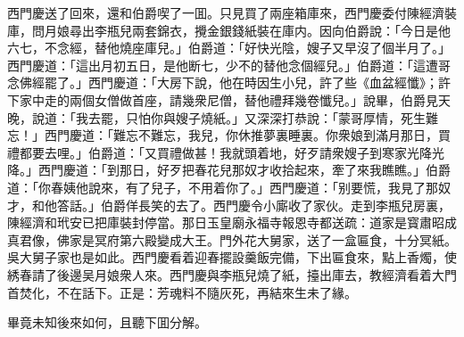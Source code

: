 西門慶送了回來，還和伯爵喫了一囬。只見買了兩座箱庫來，西門慶委付陳經濟裝庫，問月娘尋出李瓶兒兩套錦衣，攪金銀錢紙裝在庫内。因向伯爵說：「今日是他六七，不念經，替他燒座庫兒。」伯爵道：「好快光陰，嫂子又早沒了個半月了。」西門慶道：「這出月初五日，是他断七，少不的替他念個經兒。」伯爵道：「這遭哥念佛經罷了。」西門慶道：「大房下說，他在時因生小兒，許了些《血盆經懺》；許下家中走的兩個女僧做首座，請幾衆尼僧，替他禮拜幾卷懺兒。」說畢，伯爵見天晚，說道：「我去罷，只怕你與嫂子燒紙。」又深深打恭說：「蒙哥厚情，死生難忘！」西門慶道：「難忘不難忘，我兒，你休推夢裏睡裏。你衆娘到滿月那日，買禮都要去哩。」伯爵道：「又買禮做甚！我就頭着地，好歹請衆嫂子到寒家光降光降。」西門慶道：「到那日，好歹把春花兒那奴才收拾起來，牽了來我瞧瞧。」伯爵道：「你春姨他說來，有了兒子，不用着你了。」西門慶道：「别要慌，我見了那奴才，和他答話。」伯爵佯長笑的去了。西門慶令小廝收了家伙。走到李瓶兒房裏，陳經濟和玳安已把庫裝封停當。那日玉皇廟永福寺報恩寺都送疏：道家是寳肅昭成真君像，佛家是冥府第六殿變成大王。門外花大舅家，送了一盒匾食，十分冥紙。吳大舅子家也是如此。西門慶看着迎春擺設羹飯完備，下出匾食來，點上香燭，使綉春請了後邊吴月娘衆人來。西門慶與李瓶兒燒了紙，擡出庫去，教經濟看着大門首焚化，不在話下。正是：芳魂料不隨灰死，再結來生未了緣。

畢竟未知後來如何，且聽下囬分解。

